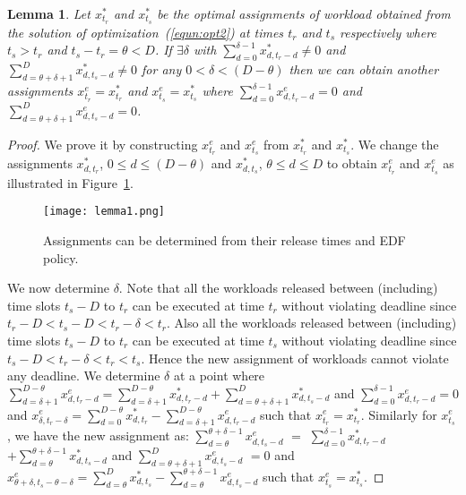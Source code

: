 \documentclass[10pt,conference,compsocconf,letterpaper]{IEEEtran}
\newtheorem{lemma}{\bf Lemma}
\begin{document}
\begin{lemma}
\label{lemma:edf}  Let $x^*_{t_r}$ and $x^*_{t_s}$ be the optimal assignments of workload obtained from the solution of optimization~(\ref{equn:opt2}) at times $t_r$ and $t_s$ respectively where $t_s>t_r$ and $t_s-t_r = \theta < D$. If $\exists \delta$ with $\sum_{d=0}^{\delta-1} x^*_{d, t_r-d}\ne 0$ and $\sum_{d=\theta+\delta+1}^{D} x^*_{d, t_s-d}\ne 0$ for any $0<\delta<(D-\theta)$ then we can obtain another assignments $x^{e}_{t_r}= x^*_{t_r}$ and $x^{e}_{t_s}= x^*_{t_s}$ where $\sum_{d=0}^{\delta-1} x^e_{d, t_r-d}= 0$ and $\sum_{d=\theta+\delta+1}^{D} x^e_{d, t_s-d}= 0$.
\end{lemma}

\begin{proof}
We prove it by constructing $x^{e}_{t_r}$ and $x^{e}_{t_s}$ from $x^*_{t_r}$ and $x^*_{t_s}$. We change the assignments $x^*_{d,t_r}$, $0\le d \le (D-\theta)$ and $x^*_{d,t_s}$, $\theta \le d \le D$ to obtain $x^{e}_{t_r}$ and $x^{e}_{t_s}$ as illustrated in Figure~\ref{fig:lemma1}.
\begin{figure}[!ht]
\begin{center}
\texttt{[image: lemma1.png]}
\caption{Assignments can be determined from their release times and EDF policy.}
\label{fig:lemma1}
\end{center}
\end{figure}
We now determine $\delta$. Note that all the workloads released between (including) time slots $t_s-D$ to $t_r$ can be executed at time $t_r$ without violating deadline since $t_r-D<t_s-D<t_r-\delta <t_r$. Also all the workloads released between (including) time slots $t_s-D$ to $t_r$ can be executed at time $t_s$ without violating deadline since $t_s-D<t_r-\delta <t_r<t_s$. Hence the new assignment of workloads cannot violate any deadline. We determine $\delta$ at a point where $\sum_{d=\delta+1}^{D-\theta} x^e_{d, t_r-d} = \sum_{d=\delta+1}^{D-\theta} x^*_{d, t_r-d} + \sum_{d=\theta+ \delta+1}^{D} x^*_{d, t_s-d}$ and $\sum_{d=0}^{\delta-1} x^e_{d, t_r-d}= 0$ and $x^e_{\delta, t_r-\delta} = \sum_{d=0}^{D-\theta} x^*_{d,t_r} - \sum_{d=\delta+1}^{D-\theta} x^e_{d, t_r-d}$ such that $x^{e}_{t_r}= x^*_{t_r}$. Similarly for $x^{e}_{t_s}$, we have the new assignment as: $\sum_{d=\theta}^{\theta+\delta-1} x^e_{d, t_s-d}$ $=$
$\sum_{d=0}^{\delta-1} x^*_{d, t_r-d}$ $ + \sum_{d=\theta}^{\theta+ \delta-1} x^*_{d, t_s-d}$ and $\sum_{d=\theta+ \delta+1}^{D} x^e_{d, t_s-d}$ $= 0$ and $x^e_{\theta+\delta, t_s-\theta-\delta} = \sum_{d=\theta}^{D} x^*_{d,t_s} - \sum_{d=\theta}^{\theta+\delta-1} x^e_{d, t_s-d}$ such that $x^{e}_{t_s}= x^*_{t_s}$.
\end{proof}
\end{document}
